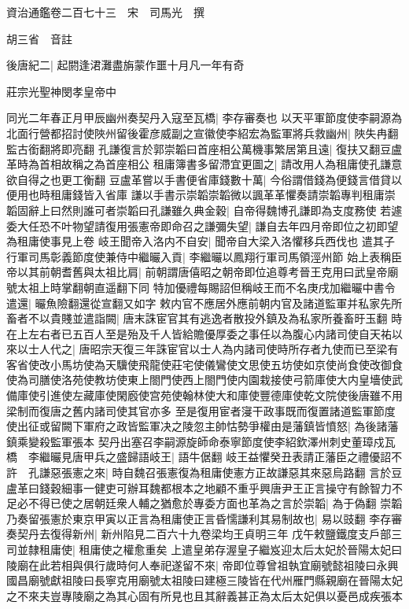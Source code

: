 資治通鑑卷二百七十三　宋　司馬光　撰

胡三省　音註

後唐紀二|{
	起閼逢涒灘盡旃蒙作噩十月凡一年有奇}


莊宗光聖神閔孝皇帝中

同光二年春正月甲辰幽州奏契丹入寇至瓦橋|{
	李存審奏也}
以天平軍節度使李嗣源為北面行營都招討使陜州留後霍彦威副之宣徽使李紹宏為監軍將兵救幽州|{
	陜失冉翻監古銜翻將即亮翻}
孔謙復言於郭崇韜曰首座相公萬機事繁居第且遠|{
	復扶又翻豆盧革時為首相故稱之為首座相公}
租庸簿書多留滯宜更圖之|{
	請改用人為租庸使孔謙意欲自得之也更工衡翻}
豆盧革嘗以手書便省庫錢數十萬|{
	今俗謂借錢為便錢言借貸以便用也時租庸錢皆入省庫}
謙以手書示崇韜崇韜微以諷革革懼奏請崇韜專判租庸崇韜固辭上曰然則誰可者崇韜曰孔謙雖久典金穀|{
	自帝得魏博孔謙即為支度務使}
若遽委大任恐不叶物望請復用張憲帝即命召之謙彌失望|{
	謙自去年四月帝即位之初即望為租庸使事見上卷}
岐王聞帝入洛内不自安|{
	聞帝自大梁入洛懼移兵西伐也}
遣其子行軍司馬彰義節度使兼侍中繼曮入貢|{
	李繼曮以鳳翔行軍司馬領涇州節}
始上表稱臣帝以其前朝耆舊與太祖比肩|{
	前朝謂唐僖昭之朝帝即位追尊考晉王克用曰武皇帝廟號太祖上時掌翻朝直遥翻下同}
特加優禮每賜詔但稱岐王而不名庚戌加繼曮中書令遣還|{
	曮魚險翻還從宣翻又如字}
敕内官不應居外應前朝内官及諸道監軍并私家先所畜者不以貴賤並遣詣闕|{
	唐末誅宦官其有逃逸者散投外鎮及為私家所養畜旴玉翻}
時在上左右者已五百人至是殆及千人皆給贍優厚委之事任以為腹心内諸司使自天祐以來以士人代之|{
	唐昭宗天復三年誅宦官以士人為内諸司使時所存者九使而已至梁有客省使改小馬坊使為天驥使飛龍使莊宅使儀鸞使文思使五坊使如京使尚食使改御食使為司膳使洛苑使教坊使東上閤門使西上閤門使内園栽接使弓箭庫使大内皇墻使武備庫使引進使左藏庫使閑廏使宫苑使翰林使大和庫使豐德庫使乾文院使後唐雖不用梁制而復唐之舊内諸司使其官亦多}
至是復用宦者寖干政事既而復置諸道監軍節度使出征或留闕下軍府之政皆監軍决之陵忽主帥怙勢爭權由是藩鎮皆憤怒|{
	為後諸藩鎮乘變殺監軍張本}
契丹出塞召李嗣源旋師命泰寧節度使李紹欽澤州刺史董璋戍瓦橋　李繼曮見唐甲兵之盛歸語岐王|{
	語牛倨翻}
岐王益懼癸丑表請正藩臣之禮優詔不許　孔謙惡張憲之來|{
	時自魏召張憲復為租庸使憲方正故謙惡其來惡烏路翻}
言於豆盧革曰錢穀細事一健吏可辦耳魏都根本之地顧不重乎興唐尹王正言操守有餘智力不足必不得已使之居朝廷衆人輔之猶愈於專委方面也革為之言於崇韜|{
	為于偽翻}
崇韜乃奏留張憲於東京甲寅以正言為租庸使正言昏懦謙利其易制故也|{
	易以豉翻}
李存審奏契丹去復得新州|{
	新州陷見二百六十九卷梁均王貞明三年}
戊午敕鹽鐵度支戶部三司並隸租庸使|{
	租庸使之權愈重矣}
上遣皇弟存渥皇子繼岌迎太后太妃於晉陽太妃曰陵廟在此若相與俱行歲時何人奉祀遂留不來|{
	帝即位尊曾祖執宜廟號懿祖陵曰永興國昌廟號獻祖陵曰長寧克用廟號太祖陵曰建極三陵皆在代州雁門縣親廟在晉陽太妃之不來夫豈專陵廟之為其心固有所見也且其辭義甚正為太后太妃俱以憂邑成疾張本}

